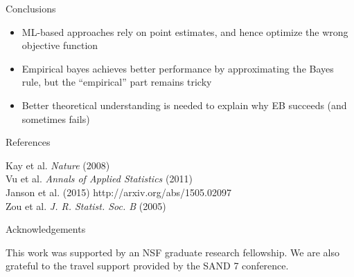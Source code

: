 \documentclass[final]{beamer}
\newlength{\onecolwid}
\begin{document}
\begin{frame}[t]
\begin{columns}[t]
\begin{column}{\onecolwid}
\begin{block}{Conclusions}
\begin{itemize}
\item ML-based approaches rely on point estimates, and hence optimize the wrong objective function
\item Empirical bayes achieves better performance by approximating the Bayes rule, but the ``empirical'' part remains tricky
\item Better theoretical understanding is needed to explain why EB succeeds (and sometimes fails)
\end{itemize}
\end{block}


\begin{block}{References}

\small{
\noindent [1] Kay et al. \emph{Nature} (2008)\\
\noindent [2] Vu et al. \emph{Annals of Applied Statistics} (2011)\\
\noindent [3] Janson et al. (2015) http://arxiv.org/abs/1505.02097\\
\noindent [4] Zou et al. \emph{J. R. Statist. Soc. B} (2005)
}

\end{block}


\begin{block}{Acknowledgements}


\small{ This work was supported by an NSF graduate research fellowship.
  We are also grateful to the travel support provided by the SAND 7 conference.  }

\end{block}





\end{column} %

\end{columns} %

\end{frame} %
\end{document}
